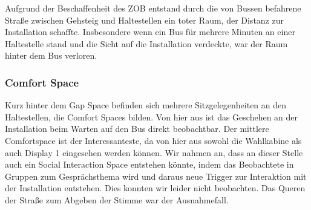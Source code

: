 Aufgrund der Beschaffenheit des ZOB entstand durch die von Bussen befahrene Straße zwischen Gehsteig und Haltestellen ein toter Raum, der Distanz zur Installation schaffte.
Insbesondere wenn ein Bus für mehrere Minuten an einer Haltestelle stand und die Sicht auf die Installation verdeckte, war der Raum hinter dem Bus verloren.

\subsubsection{Comfort Space}\label{comfort-space}

Kurz hinter dem Gap Space befinden sich mehrere Sitzgelegenheiten an den Haltestellen, die Comfort Spaces bilden.
Von hier aus ist das Geschehen an der Installation beim Warten auf den Bus direkt beobachtbar.
Der mittlere Comfortspace ist der Interessanteste, da von hier aus sowohl die Wahlkabine als auch Display 1 eingesehen werden können.
Wir nahmen an, dass an dieser Stelle auch ein Social Interaction Space entstehen könnte, indem das Beobachtete in Gruppen zum Gesprächsthema wird und daraus neue Trigger zur Interaktion mit der Installation entstehen.
Dies konnten wir leider nicht beobachten.
Das Queren der Straße zum Abgeben der Stimme war der Ausnahmefall.